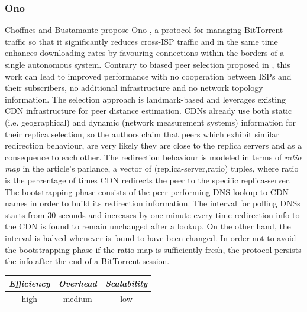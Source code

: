 \subsubsection{Ono}
Choffnes and Bustamante propose Ono \cite{cb_ono_2008}, a protocol for managing
BitTorrent traffic so that it significantly reduces cross-ISP traffic and in
the same time enhances downloading rates by favouring connections within the
borders of a single autonomous system. Contrary to biased peer selection
proposed in \cite{rpc_bitbiased_2006}, this work can lead to improved
performance with no cooperation between ISPs and their subscribers, no
additional infrastructure and no network topology information. The selection
approach is landmark-based and leverages existing CDN infrastructure for peer
distance estimation. CDNs already use both static (i.e. geographical) and
dynamic (network measurement systems) information for their replica selection,
so the authors claim that peers which exhibit similar redirection behaviour, are
very likely they are close to the replica servers and as a consequence to each
other. The redirection behaviour is modeled in terms of \emph{ratio map} in the
article's parlance, a vector of (replica-server,ratio) tuples, where ratio is
the percentage of times CDN redirects the peer to the specific replica-server.
The bootstrapping phase consists of the peer performing DNS lookup to CDN names
in order to build its redirection information. The interval for polling DNSs
starts from 30 seconds and increases by one minute every time redirection info
to the CDN is found to remain unchanged after a lookup. On the other hand, the
interval is halved whenever is found to have been changed. In order not to avoid
the bootstrapping phase if the ratio map is sufficiently fresh, the protocol
persists the info after the end of a BitTorrent session.

\begin{center}
\begin{tabular}{ccc}
\emph{Efficiency} & \emph{Overhead} & \emph{Scalability} \\
\hline
high &
medium &
low
\end{tabular}
\end{center}

